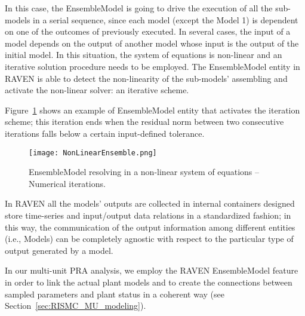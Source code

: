 In this case, the EnsembleModel is going to drive the execution of all the sub-models in a serial sequence, 
since each model (except the Model 1) is dependent on one of the outcomes of previously executed.
In several cases, the input of a model depends on the output of another model whose input is the output 
of the initial model. In this situation, the system of equations is non-linear and an iterative solution 
procedure needs to be employed. The EnsembleModel entity in RAVEN is able to detect the non-linearity of 
the sub-models’ assembling and activate the non-linear solver: an iterative scheme. 

Figure~\ref{fig:exampleEnsembleModelNonLinear} shows an example 
of EnsembleModel entity that activates the iteration scheme; this iteration ends when the residual norm 
between two consecutive iterations falls below a certain input-defined tolerance.

 \begin{figure}
    \centering
    \centerline{\texttt{[image: NonLinearEnsemble.png]}} 
    \caption{EnsembleModel resolving in a non-linear system of equations – Numerical iterations.}
    \label{fig:exampleEnsembleModelNonLinear}
\end{figure}

In RAVEN all the models’ outputs are collected in internal containers 
designed store time-series and input/output data relations in a standardized 
fashion; in this way, the communication of the output information among different entities (i.e., Models) 
can be completely agnostic with respect to the particular type of output generated by a 
model.

In our multi-unit PRA analysis, we employ the RAVEN EnsembleModel feature in order to link the actual
plant models and to create the connections between sampled parameters and plant status in a coherent way 
(see Section~\ref{sec:RISMC_MU_modeling}).

 